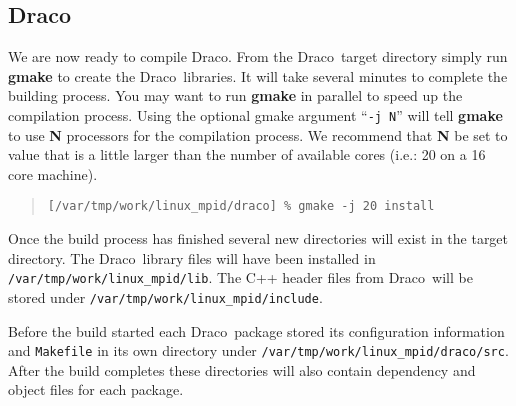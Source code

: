 \documentclass[11pt]{nmemo}
\newcommand{\comp}[1]{\normalfont\footnotesize\texttt{#1}\normalsize}
\newcommand{\draco}{{\normalfont\sffamily Draco}}
\begin{document}
\subsection{\draco}





We are now ready to compile \draco.  From the \draco\ target directory
simply run \textbf{gmake} to create the \draco\ libraries.  It will
take several minutes to complete the building process.  You may want
to run \textbf{gmake} in parallel to speed up the compilation
process.  Using the optional gmake argument ``\comp{-j N}'' will tell
\textbf{gmake} to use \textbf{N} processors for the compilation
process.  We recommend that \textbf{N} be set to value that is a
little larger than the number of available cores (i.e.: 20 on a 16
core machine).

\footnotesize
\begin{verse}
\texttt{[/var/tmp/work/linux\_mpid/draco] \% gmake -j 20 install}
\end{verse}
\normalsize

Once the build process has finished several new directories will exist
in the target directory.  The \draco\ library files will have been
installed in \comp{/var/tmp/work/linux\_mpid/lib}.  The C++ header
files from \draco\ will be stored under
\comp{/var/tmp/work/linux\_mpid/include}.

Before the build started each \draco\ package stored its configuration
information and \comp{Makefile} in its own directory under
\comp{/var/tmp/work/linux\_mpid/draco/src}.  After the build completes
these directories will also contain dependency and object files for
each package.
\end{document}
